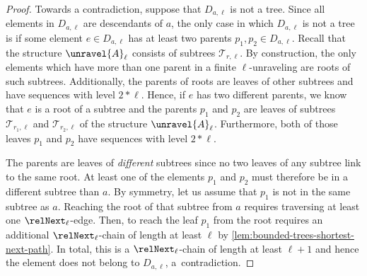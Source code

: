 \begin{proof}
  Towards a contradiction, suppose that $D_{a,\ell}$ is not a tree.
  Since all elements in $D_{a,\ell}$ are descendants of $a$, the only case in which $D_{a,\ell}$ is not a tree is if some element $e \in D_{a,\ell}$ has at least two parents $p_{1}, p_{2} \in D_{a,\ell}$.
  Recall that the structure $\unravel{A}_{\ell}$ consists of subtrees $\mathcal{T}_{r,\ell}$.
  By construction, the only elements which have more than one parent in a finite $\ell$-unraveling are roots of such subtrees.
  Additionally, the parents of roots are leaves of other subtrees and have sequences with level $2 * \ell$.
  Hence, if $e$ has two different parents, we know that $e$ is a root of a subtree and the parents $p_{1}$ and $p_{2}$ are leaves of subtrees $\mathcal{T}_{r_{1},\ell}$ and $\mathcal{T}_{r_{2},\ell}$ of the structure $\unravel{A}_{\ell}$.
  Furthermore, both of those leaves $p_{1}$ and $p_{2}$ have sequences with level $2 * \ell$.

  The parents are leaves of \emph{different} subtrees since no two leaves of any subtree link to the same root.
  At least one of the elements $p_{1}$ and $p_{2}$ must therefore be in a different subtree than $a$.
  By symmetry, let us assume that $p_{1}$ is not in the same subtree as $a$.
  Reaching the root of that subtree from $a$ requires traversing at least one $\relNext_{\ell}$-edge.
  Then, to reach the leaf $p_{1}$ from the root requires an additional $\relNext_{\ell}$-chain of length at least $\ell$ by \cref{lem:bounded-trees-shortest-next-path}.
  In total, this is a $\relNext_{\ell}$-chain of length at least $\ell + 1$ and hence the element does not belong to $D_{a,\ell}$, a~contradiction.
\end{proof}
\fi
